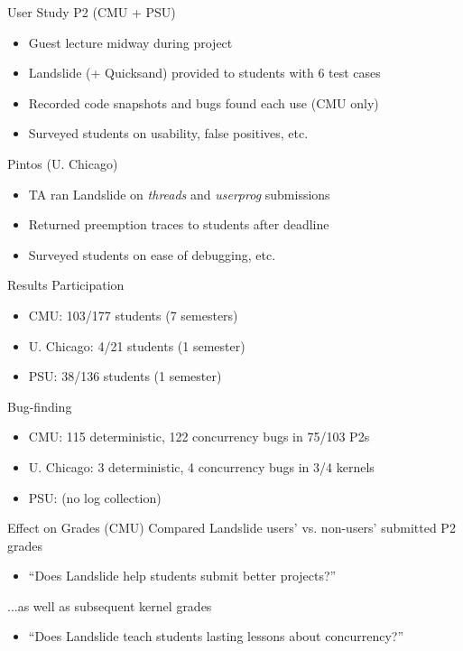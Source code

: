 \documentclass[xcolor=dvipsnames]{beamer}
\begin{document}
\begin{frame}{User Study}
	P2 (CMU + PSU)
	\begin{itemize}
		\item Guest lecture midway during project
		\item Landslide (+ Quicksand) provided to students with 6 test cases %
		\item Recorded code snapshots and bugs found each use (CMU only)
		\item Surveyed students on usability, false positives, etc.
	\end{itemize}
	\pause
	\linegap

	Pintos (U. Chicago)
	\begin{itemize}
		\item TA %
			ran Landslide on {\em threads} and {\em userprog} submissions
		\item Returned preemption traces to students after deadline
		\item Surveyed students on ease of debugging, etc.
	\end{itemize}
\end{frame}

\begin{frame}{Results}
	Participation
	\begin{itemize}
		\item CMU: 103/177 students (7 semesters)
		\item U. Chicago: 4/21 students (1 semester)
		\item PSU: 38/136 students (1 semester)
	\end{itemize}
	\linegap

	Bug-finding
	\begin{itemize}
		\item CMU: 115 deterministic, 122 concurrency bugs in 75/103 P2s
		\item U. Chicago: 3 deterministic, 4 concurrency bugs in 3/4 kernels
		\item PSU: (no log collection) %
	\end{itemize}
\end{frame}

\begin{frame}{Effect on Grades (CMU)}
	Compared Landslide users' vs. non-users' submitted P2 grades
	\begin{itemize}
		\item ``Does Landslide help students submit better projects?''
	\end{itemize}
	\linegap

	...as well as subsequent kernel grades
	\begin{itemize}
		\item ``Does Landslide teach students lasting lessons about concurrency?''
	\end{itemize}
\end{frame}
\end{document}
